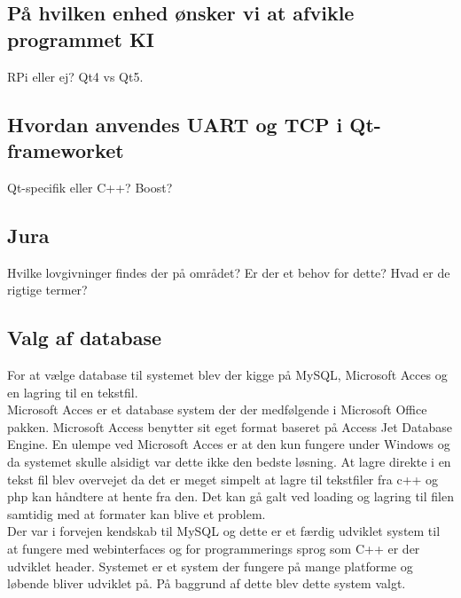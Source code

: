 \subsection{På hvilken enhed ønsker vi at afvikle programmet KI}
RPi eller ej? Qt4 vs Qt5.
\subsection{Hvordan anvendes UART og TCP i Qt-frameworket}
Qt-specifik eller C++? Boost? 

\subsection{Jura}
Hvilke lovgivninger findes der på området? Er der et behov for dette? Hvad er de rigtige termer? 

\subsection{Valg af database}
For at vælge database til systemet blev der kigge på MySQL, Microsoft Acces og en lagring til en tekstfil.\\
Microsoft Acces er et database system der der medfølgende i Microsoft Office pakken. Microsoft Access benytter sit eget format baseret på Access Jet Database Engine. En ulempe ved Microsoft Acces er at den kun fungere under Windows og da systemet skulle alsidigt var dette ikke den bedste løsning. At lagre direkte i en tekst fil blev overvejet da det er meget simpelt at lagre til tekstfiler fra c++ og php kan håndtere at hente fra den. Det kan gå galt ved loading og lagring til filen samtidig med at formater kan blive et problem. \\
Der var i forvejen kendskab til MySQL og dette er et færdig udviklet system til at fungere med webinterfaces og for programmerings sprog som C++ er der udviklet header. Systemet er et system der fungere på mange platforme og løbende bliver udviklet på. På baggrund af dette blev dette system valgt.

